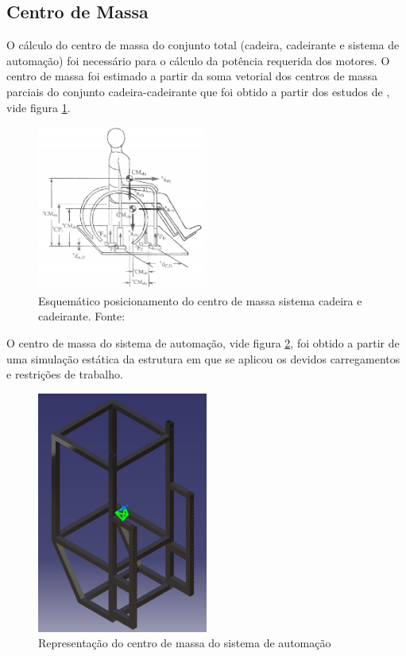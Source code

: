 \subsection{Centro de Massa}

O cálculo do centro de massa do conjunto total (cadeira, cadeirante e sistema de automação) foi necessário para o cálculo da potência requerida dos motores. O centro de massa foi estimado a partir da soma vetorial dos centros de massa parciais do conjunto cadeira-cadeirante que foi obtido a partir dos estudos de \cite{artigo_centro_massa}, vide figura \ref{fig:centro_massa_cadeirante}.

\begin{figure}[!htb]
\centering
\includegraphics[width = 0.5\textwidth]{figuras/resultados/centro_massa_cadeirante}
\caption{Esquemático posicionamento do centro de massa sistema cadeira e cadeirante. Fonte:\cite{artigo_centro_massa}}
\label{fig:centro_massa_cadeirante}
\end{figure}

O centro de massa do sistema de automação, vide figura \ref{fig:centro_massa_sistema_automocao}, foi obtido a partir de uma simulação estática da estrutura em que se aplicou os devidos carregamentos e restrições de trabalho.

\begin{figure}[!htb]
\centering
\includegraphics[width = 0.5\textwidth]{figuras/resultados/centro_massa_sistema_automocao}
\caption{Representação do centro de massa do sistema de automação}
\label{fig:centro_massa_sistema_automocao}
\end{figure}

